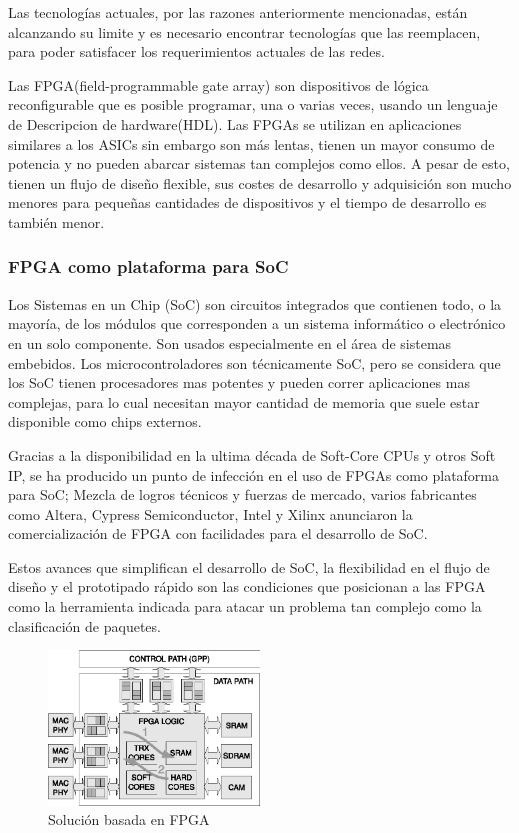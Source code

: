 Las tecnologías actuales, por las razones anteriormente mencionadas, están alcanzando su limite y es necesario encontrar tecnologías que las reemplacen, para poder satisfacer los requerimientos actuales de las redes. 

Las FPGA(field-programmable gate array) son dispositivos de lógica reconfigurable que es posible programar, una o varias veces, usando un lenguaje de Descripcion de hardware(HDL). Las FPGAs se utilizan en aplicaciones similares a los ASICs sin embargo son más lentas, tienen un mayor consumo de potencia y no pueden abarcar sistemas tan complejos como ellos. A pesar de esto, tienen un flujo de diseño flexible, sus costes de desarrollo y adquisición son mucho menores para pequeñas cantidades de dispositivos y el tiempo de desarrollo es también menor.

\subsubsection{FPGA como plataforma para SoC}

Los Sistemas en un Chip (SoC) son circuitos integrados que contienen todo, o la mayoría, de los módulos que corresponden a un sistema informático o electrónico en un solo componente. Son usados especialmente en el área de sistemas embebidos. Los microcontroladores son técnicamente SoC, pero se considera que los SoC tienen procesadores mas potentes y pueden correr aplicaciones mas complejas, para lo cual necesitan mayor cantidad de memoria que suele estar disponible como chips externos. 

Gracias a la disponibilidad en la ultima década de Soft-Core CPUs y otros Soft IP, se ha producido un punto de infección en el uso de FPGAs como plataforma para SoC; Mezcla de logros técnicos y fuerzas de mercado, varios fabricantes como Altera, Cypress Semiconductor, Intel y Xilinx anunciaron la comercialización de FPGA con facilidades para el desarrollo de SoC.

Estos avances que simplifican el desarrollo de SoC, la flexibilidad en el flujo de diseño y el prototipado rápido son las condiciones que posicionan a las FPGA como la herramienta indicada para atacar un problema tan complejo como la clasificación de paquetes. 

 \begin{figure}[h]
  \centering
	 \includegraphics[width=0.5\textwidth]{1-introduccion/graf/FPGA_based.eps}
  \caption{Solución basada en FPGA}
  \label{fig:diseno}
\end{figure}

